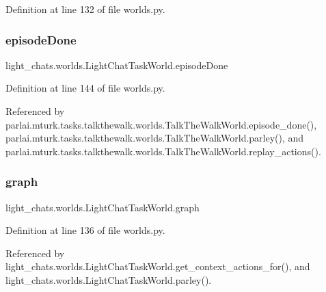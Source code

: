 Definition at line 132 of file worlds.\+py.

\mbox{\label{classlight__chats_1_1worlds_1_1LightChatTaskWorld_a9123e29fdef98b5ca9cb3b44a15c147c}} 
\subsubsection{\texorpdfstring{episode\+Done}{episodeDone}}
{\footnotesize\ttfamily light\+\_\+chats.\+worlds.\+Light\+Chat\+Task\+World.\+episode\+Done}



Definition at line 144 of file worlds.\+py.



Referenced by parlai.\+mturk.\+tasks.\+talkthewalk.\+worlds.\+Talk\+The\+Walk\+World.\+episode\+\_\+done(), parlai.\+mturk.\+tasks.\+talkthewalk.\+worlds.\+Talk\+The\+Walk\+World.\+parley(), and parlai.\+mturk.\+tasks.\+talkthewalk.\+worlds.\+Talk\+The\+Walk\+World.\+replay\+\_\+actions().

\mbox{\label{classlight__chats_1_1worlds_1_1LightChatTaskWorld_aded32ffc23a823ecc788982d2748fd18}} 
\subsubsection{\texorpdfstring{graph}{graph}}
{\footnotesize\ttfamily light\+\_\+chats.\+worlds.\+Light\+Chat\+Task\+World.\+graph}



Definition at line 136 of file worlds.\+py.



Referenced by light\+\_\+chats.\+worlds.\+Light\+Chat\+Task\+World.\+get\+\_\+context\+\_\+actions\+\_\+for(), and light\+\_\+chats.\+worlds.\+Light\+Chat\+Task\+World.\+parley().


